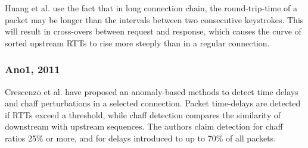 \documentclass[runningheads,11pt]{llncs}\usepackage[]{graphicx}\usepackage[]{color}
\begin{document}
Huang et al. \cite{huang2016detecting} use the fact that in long connection chain, the round-trip-time of a packet may be longer than the intervals between two consecutive keystrokes. %
This will result in cross-overs between request and response, which causes the curve of sorted upstream RTTs to rise more steeply than in a regular connection. %






\vspace{-0.6cm}
\subsubsection{Ano1, 2011}

Crescenzo et al. \cite{di2011detecting} have proposed an anomaly-based methods to detect time delays and chaff perturbations in a selected connection. 
Packet time-delays are detected if RTTs exceed a threshold, while chaff detection compares the similarity of downstream with upstream sequences.%
The authors claim detection for chaff ratios 25\% or more, and for delays introduced to up to 70\% of all packets.

\vspace{-0.6cm}
\end{document}

